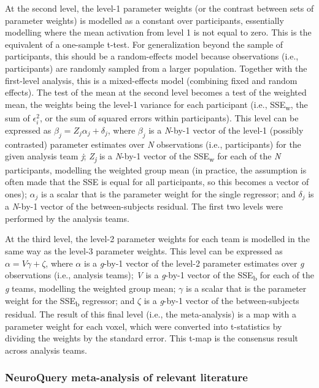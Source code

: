 \documentclass[a4paper,doc,natbib]{apa6}
\begin{document}
At the second level, the level-1 parameter weights (or the contrast between sets of parameter weights) is modelled as a constant over participants, essentially modelling where the mean activation from level 1 is not equal to zero. This is the equivalent of a one-sample t-test. For generalization beyond the sample of participants, this should be a random-effects model because observations (i.e., participants) are randomly sampled from a larger population. Together with the first-level analysis, this is a mixed-effects model (combining fixed and random effects). The test of the mean at the second level becomes a test of the weighted mean, the weights being the level-1 variance for each participant (i.e., SSE\textsubscript{w}, the sum of $\epsilon_{i}^2$, or the sum of squared errors within participants). This level can be expressed as $\beta_{j}=Z_{j} \alpha_{j} +\delta_{j}$, where $\beta_j$ is a \textit{N}-by-1 vector of the level-1 (possibly contrasted) parameter estimates over \textit{N} observations (i.e., participants) for the given analysis team \textit{j}; \textit{Z\textsubscript{j}} is a \textit{N}-by-1 vector of the SSE\textsubscript{w} for each of the \textit{N} participants, modelling the weighted group mean (in practice, the assumption is often made that the SSE is equal for all participants, so this becomes a vector of ones); \textit{$\alpha_j$} is a scalar that is the parameter weight for the single regressor; and \textit{$\delta_j$} is a \textit{N}-by-1 vector of the between-subjects residual. The first two levels were performed by the analysis teams. 

At the third level, the level-2 parameter weights for each team is modelled in the same way as the level-3 parameter weights. This level can be expressed as $\alpha=V \gamma +\zeta$, where $\alpha$ is a \textit{g}-by-1 vector of the level-2 parameter estimates over \textit{g} observations (i.e., analysis teams); \textit{V} is a \textit{g}-by-1 vector of the SSE\textsubscript{b} for each of the \textit{g} teams, modelling the weighted group mean; \textit{$\gamma$} is a scalar that is the parameter weight for the SSE\textsubscript{b} regressor; and \textit{$\zeta$} is a \textit{g}-by-1 vector of the between-subjects residual. The result of this final level (i.e., the meta-analysis) is a map with a parameter weight for each voxel, which were converted into t-statistics by dividing the weights by the standard error. This t-map is the consensus result across analysis teams. 

\subsubsection{NeuroQuery meta-analysis of relevant literature}
\end{document}
